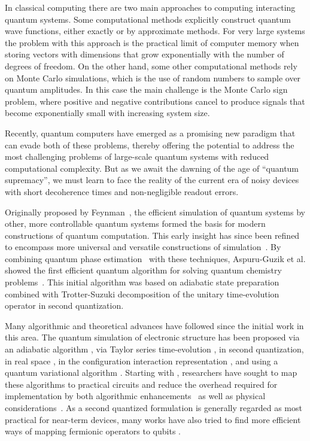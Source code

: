 \documentclass[11pt]{article}
\begin{document}
In classical computing there are two main approaches to computing interacting quantum systems. Some computational methods explicitly construct quantum wave functions, either exactly or by approximate methods.  For very large systems the problem with this approach is the practical limit of computer memory when storing vectors with dimensions that grow exponentially with the number of degrees of freedom.  On the other hand, some other computational methods rely on Monte Carlo simulations, which is the use of random numbers to sample over quantum amplitudes.  In this case the main challenge is the Monte Carlo sign problem, where positive and negative contributions cancel to produce signals that become exponentially small with increasing system size.

Recently, quantum computers
have emerged as a promising new paradigm that can evade both of these problems, thereby offering
the potential to address the most challenging problems of large-scale quantum systems with reduced
computational complexity. But as we await the dawning of the age of ``quantum supremacy'', we must learn to face the reality of the current era of noisy devices with short decoherence times and non-negligible readout errors.

Originally proposed by Feynman~\cite{Feynman:1981tf}, the efficient
simulation of quantum systems by other, more controllable quantum
systems formed the basis for modern constructions of quantum
computation.  This early insight has since been refined to encompass
more universal and versatile constructions of
simulation~\cite{Lloyd1996,Abrams1997}. By combining quantum phase
estimation~\cite{Kitaev:1995qy} with these techniques, Aspuru-Guzik et
al. showed the first efficient quantum algorithm for solving quantum
chemistry problems~\cite{Aspuru-Guzik1704}. This initial algorithm was
based on adiabatic state preparation combined with Trotter-Suzuki
decomposition of the unitary time-evolution operator
\cite{Trotter1959,Suzuki1993} in second quantization.

Many algorithmic and theoretical advances have followed since the
initial work in this area. The quantum simulation of electronic
structure has been proposed via an adiabatic algorithm
\cite{BabbushAQChem}, via Taylor series time-evolution
\cite{BabbushSparse1}, in second quantization, in real space
\cite{Kassal2008,Kivlichan2016}, in the configuration interaction
representation \cite{Toloui2013,BabbushSparse2}, and using a quantum
variational algorithm \cite{Peruzzo2013,McClean:2016qr}. Starting with
\cite{Whitfield2010}, researchers have sought to map these algorithms
to practical circuits and reduce the overhead required for
implementation by both algorithmic
enhancements~\cite{Wecker2014,Poulin2014,Hastings2015,Romero2017} as
well as physical considerations~\cite{BabbushTrotter,McClean2014}. As
a second quantized formulation is generally regarded as most practical
for near-term devices, many works have also tried to find more
efficient ways of mapping fermionic operators to qubits
\cite{Seeley2012,Tranter2015,Whitfield2016,Bravyi2017,Havlicek2017}.
\end{document}
